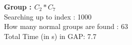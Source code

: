 \textbf{Group : $C_2*C_7$}\\
Searching up to index : 1000\\
How many normal groups are found : 63\\
Total Time (in s) in GAP: 7.7\\
